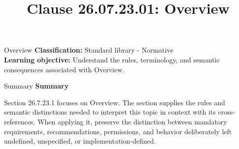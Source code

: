 \documentclass[10pt,letterpaper]{article}
\title{Clause 26.07.23.01: Overview}
\author{}
\date{}
\begin{document}
\maketitle
\begin{CornellOverviewBox}{Overview}
\textbf{Classification:} Standard library - Normative\\[2pt]
\textbf{Learning objective:} Understand the rules, terminology, and semantic consequences associated with Overview.
\end{CornellOverviewBox}\begin{CornellSummaryBox}{Summary}
{\sffamily\bfseries\color{Accent} Summary}\par\vspace{3pt}Section 26.7.23.1 focuses on Overview. The section supplies the rules and semantic distinctions needed to interpret this topic in context with its cross-references. When applying it, preserve the distinction between mandatory requirements, recommendations, permissions, and behavior deliberately left undefined, unspecified, or implementation-defined.
\end{CornellSummaryBox}
\end{document}
